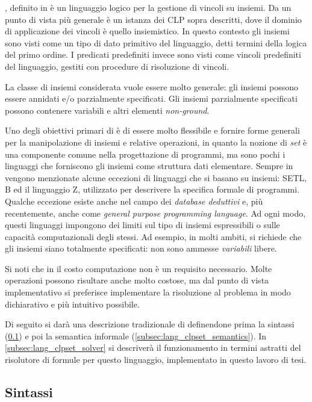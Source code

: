 \documentclass[12pt,a4paper,openright]{book} %
\begin{document}
\clpset{}, definito in \cite{Dovier00} è un linguaggio logico per la gestione di vincoli su insiemi. Da un punto di vista più generale \clpset{} è un istanza dei CLP sopra descritti, dove il dominio di applicazione dei vincoli è quello insiemistico. In questo contesto gli insiemi sono visti come un tipo di dato primitivo del linguaggio, detti termini della logica del primo ordine. I predicati predefiniti invece sono visti come vincoli predefiniti del linguaggio, gestiti con procedure di risoluzione di vincoli. 

La classe di insiemi considerata vuole essere molto generale: gli insiemi possono essere annidati e/o parzialmente specificati. Gli insiemi parzialmente specificati possono contenere variabili e altri elementi \emph{non-ground}.

Uno degli obiettivi primari di \clpset{} è di essere molto flessibile e fornire forme generali per la manipolazione di insiemi e relative operazioni, in quanto la nozione di \emph{set} è una componente comune nella progettazione di programmi, ma sono pochi i linguaggi che forniscono gli insiemi come struttura dati elementare.
Sempre in \cite{Dovier00} vengono menzionate alcune eccezioni di linguaggi che si basano su insiemi: SETL, B ed il linguaggio Z, utilizzato per descrivere la specifica formale di programmi. Qualche eccezione esiste anche nel campo dei \emph{database deduttivi} e, più recentemente, anche come \emph{general purpose programming language}. Ad ogni modo, questi linguaggi impongono dei limiti sul tipo di insiemi espressibili o sulle capacità computazionali degli stessi. Ad esempio, in molti ambiti, si richiede che gli insiemi siano totalmente specificati: non sono ammesse \emph{variabili} libere.

Si noti che in \clpset{} il costo computazione non è un requisito necessario. Molte operazioni possono risultare anche molto costose, ma dal punto di vista implementativo si preferisce implementare la risoluzione al problema in modo dichiarativo e più intuitivo possibile.

Di seguito si darà una descrizione tradizionale di \clpset{} definendone prima la sintassi (\ref{subsec:lang_clpset_sintax}) e poi la semantica informale (\ref{subsec:lang_clpset_semantics}). In \ref{subsec:lang_clpset_solver} si descriverà il funzionamento in termini astratti del risolutore di formule per questo linguaggio, implementato in questo lavoro di tesi.

\subsection{Sintassi}
\label{subsec:lang_clpset_sintax}
\end{document}
